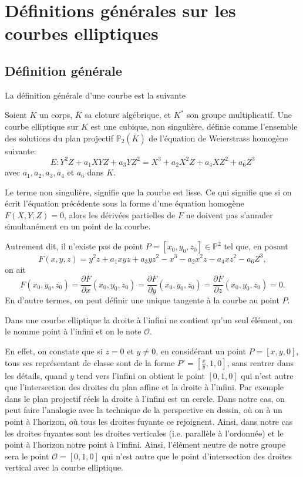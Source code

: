 \chapter{Définitions générales sur les courbes elliptiques}

\section{Définition générale}

La définition générale d'une courbe est la suivante
\begin{definition}
    Soient $K$ un corps, $\overline{K}$ sa cloture algébrique, et $K^{*}$ son groupe
    multiplicatif. Une courbe elliptique sur $K$ est une cubique, non singulière,
    définie comme l'ensemble des solutions du plan projectif $\mathbb{P}_{2}(\overline{K})$ de
    l'équation de Weierstrass homogène suivante:
\[
\label{eq:geneEll}
E: Y^2Z+a_1XYZ+a_3YZ^2 = X^3 +a_2X^2Z+a_4XZ^2+a_6Z^3
\] 
avec $a_1,a_2,a_3,a_4$ et $a_6$ dans $K$.
\end{definition}
Le terme non singulière, signifie que la courbe est lisse. Ce qui signifie que si on écrit
l'équation précédente sous la forme d'une équation homogène $F(X,Y,Z)=0$, alors les dérivées
partielles de $F$ ne doivent pas s'annuler simultanément en un point de la courbe.

Autrement dit, il n'existe pas de point $P = \left[ x_0,y_0,z_0 \right] \in \mathbb{P}^2$ tel
que, en posant
\[
F(x,y,z) = y^2z+a_1xyz+a_3yz^2 - x^3-a_2x^2z-a_4xz^2-a_6Z^3
,\] 
on ait
\[
F(x_0,y_0,z_0)=\frac{\partial{F}}{\partial{x}}(x_0,y_0,z_0) =
\frac{\partial{F}}{\partial{y}}(x_0,y_0,z_0) =
\frac{\partial{F}}{\partial{z}}(x_0,y_0,z_0) = 0
.\] 
En d'autre termes, on peut définir une unique tangente à la courbe au point $P$.

Dans une courbe elliptique la droite à l'infini ne contient qu'un seul élément, on le nomme
point à l'infini et on le note $\mathcal{O}$.

En effet, on constate
que si $z = 0$ et $y \neq 0$, en considérant un point $P=[x,y,0]$, tous ses représentant de
classe sont de la forme $P'=[\frac{x}{y},1,0]$, sans rentrer dans les détails, quand $y$ tend
vers l'infini on obtient le point $[0,1,0]$ qui n'est autre que l'intersection des droites du
plan affine et la droite à l'infini. Par exemple dans le plan projectif réels la droite à
l'infini est un cercle. Dans notre cas, on peut faire l'analogie avec la technique de
la perspective en dessin, où on à un point à l'horizon, où tous les droites fuyante ce rejoignent. Ainsi,
dans notre cas les droites fuyantes sont les droites verticales (i.e. parallèle à l'ordonnée) et le
point à l'horizon notre point à l'infini. Ainsi, l'élément neutre de notre groupe sera le point
$\mathcal{O} = [0,1,0]$ qui n'est autre que le point d'intersection des droites
vertical avec la courbe elliptique.

